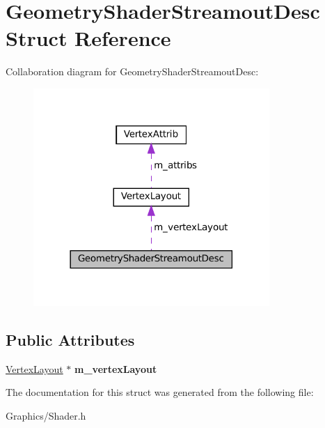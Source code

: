 \hypertarget{structGeometryShaderStreamoutDesc}{}\section{Geometry\+Shader\+Streamout\+Desc Struct Reference}
\label{structGeometryShaderStreamoutDesc}


Collaboration diagram for Geometry\+Shader\+Streamout\+Desc\+:\nopagebreak
\begin{figure}[H]
\begin{center}
\leavevmode
\includegraphics[width=254pt]{structGeometryShaderStreamoutDesc__coll__graph}
\end{center}
\end{figure}
\subsection*{Public Attributes}
\begin{DoxyCompactItemize}
\item 
\mbox{\label{structGeometryShaderStreamoutDesc_ad4bbb0c4e157ae6e9c816a7b99544cd2}} 
\hyperlink{structVertexLayout}{Vertex\+Layout} $\ast$ {\bfseries m\+\_\+vertex\+Layout}
\end{DoxyCompactItemize}


The documentation for this struct was generated from the following file\+:\begin{DoxyCompactItemize}
\item 
Graphics/Shader.\+h\end{DoxyCompactItemize}
